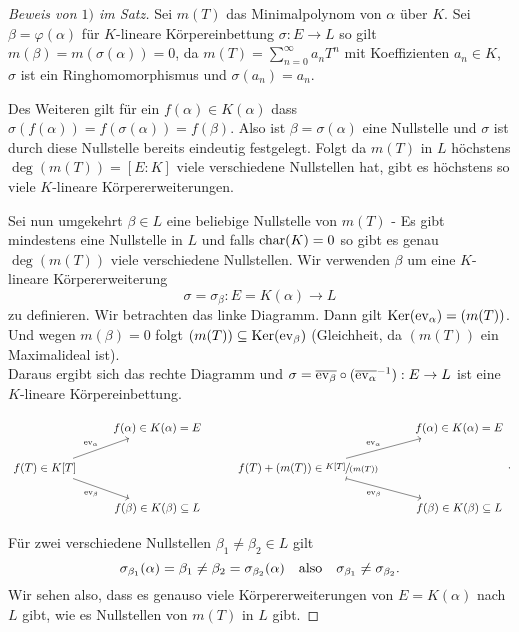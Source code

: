 \begin{proof}[Beweis von $1)$ im Satz]
	Sei $m(T)$ das Minimalpolynom von $\alpha$ über $K$. Sei $\beta = \varphi(\alpha)$ für $K$-lineare Körpereinbettung
	$\sigma: E \to L$ so gilt $m(\beta) = m(\sigma(\alpha)) = 0$, da $m(T) = \sum_{n=0}^{\infty} a_{n} T^{n}$ mit Koeffizienten $a_{n} \in K$, $\sigma$ ist ein Ringhomomorphismus
	und $\sigma(a_{n}) = a_{n}$.

	Des Weiteren gilt für ein $f(\alpha) \in K(\alpha)$ dass $\sigma(f(\alpha)) = f(\sigma(\alpha)) = f(\beta)$.
	Also ist $\beta = \sigma(\alpha)$ eine Nullstelle und $\sigma$ ist durch diese Nullstelle bereits eindeutig festgelegt.
	Folgt da $m(T)$ in $L$ höchstens $\deg(m(T)) = [E:K]$ viele verschiedene Nullstellen hat,
	gibt es höchstens so viele $K$-lineare Körpererweiterungen.

	Sei nun umgekehrt $\beta \in L$ eine beliebige Nullstelle von $m(T)$ - Es gibt mindestens eine Nullstelle in $L$ und falls
	$\operatorname{char}(K)=0$ so gibt es genau $\deg(m(T))$ viele verschiedene Nullstellen.
	Wir verwenden $\beta$ um eine $K$-lineare Körpererweiterung
	\[
		\sigma = \sigma_{\beta}: E = K(\alpha) \to L
	\] 
	zu definieren. Wir betrachten das linke Diagramm.
	Dann gilt $\operatorname{Ker}(\operatorname{ev}_{\alpha}) = (m(T))$. Und wegen $m(\beta) = 0$ folgt $(m(T)) \subseteq \operatorname{Ker}(\operatorname{ev}_{\beta})$ 
	(Gleichheit, da $(m(T))$ ein Maximalideal ist).\\
	Daraus ergibt sich das rechte Diagramm
	und $\sigma = \overline{\operatorname{ev}_{\beta}} \circ (\overline{\operatorname{ev}_{\alpha}}^{-1}) : E \to L$ ist eine $K$-lineare Körpereinbettung.
	
	\[
		\begin{tikzcd}
			& f(\alpha) \in K(\alpha) = E & & f(\alpha) \in K(\alpha) = E \\
			{f(T) \in K[T]} \arrow[ru, "\ev_\alpha"] \arrow[rd, "\ev_\beta"'] & & {f(T) + (m(T)) \in \sfrac{K[T]}{(m(T))}} \arrow[ru, "\ev_\alpha"] \arrow[rd, "\ev_\beta"', maps to] & \\
			& f(\beta) \in K(\beta) \subseteq L & & f(\beta) \in K(\beta) \subseteq L
		\end{tikzcd}
	.\]
	
	Für zwei verschiedene Nullstellen $\beta_{1} \neq \beta_{2} \in L$ gilt
	\[
		\sigma_{\beta_1}(\alpha) = \beta_1 \neq  \beta_2 = \sigma_{\beta_2}(\alpha) \qq{also} \sigma_{\beta_1} \neq  \sigma_{\beta_2}
	.\] 
	Wir sehen also, dass es genauso viele Körpererweiterungen von $E = K(\alpha)$ nach $L$ gibt, wie es Nullstellen von $m(T)$ in $L$ gibt.
\end{proof}

